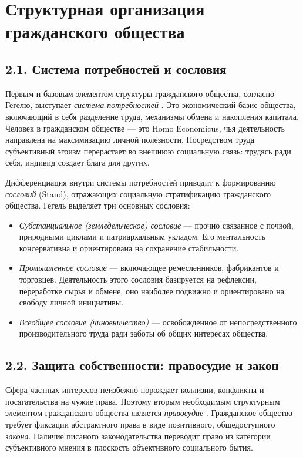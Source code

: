 \documentclass[a4paper, 14pt]{extarticle}
\begin{document}
\section{Структурная организация гражданского общества}

\subsection{2.1. Система потребностей и сословия}
Первым и базовым элементом структуры гражданского общества, согласно Гегелю, выступает \textit{система потребностей} \cite{Hegel}. Это экономический базис общества, включающий в себя разделение труда, механизмы обмена и накопления капитала. Человек в гражданском обществе --- это Homo Economicus, чья деятельность направлена на максимизацию личной полезности. Посредством труда субъективный эгоизм перерастает во внешнюю социальную связь: трудясь ради себя, индивид создает блага для других.

Дифференциация внутри системы потребностей приводит к формированию \textit{сословий} (Stand), отражающих социальную стратификацию гражданского общества. Гегель выделяет три основных сословия:
\begin{itemize}
    \item \textit{Субстанциальное (земледельческое) сословие} --- прочно связанное с почвой, природными циклами и патриархальным укладом. Его ментальность консервативна и ориентирована на сохранение стабильности.
    \item \textit{Промышленное сословие} --- включающее ремесленников, фабрикантов и торговцев. Деятельность этого сословия базируется на рефлексии, переработке сырья и обмене, оно наиболее подвижно и ориентировано на свободу личной инициативы.
    \item \textit{Всеобщее сословие (чиновничество)} --- освобожденное от непосредственного производительного труда ради заботы об общих интересах общества.
\end{itemize}

\subsection{2.2. Защита собственности: правосудие и закон}
Сфера частных интересов неизбежно порождает коллизии, конфликты и посягательства на чужие права. Поэтому вторым необходимым структурным элементом гражданского общества является \textit{правосудие} \cite{Hegel}. Гражданское общество требует фиксации абстрактного права в виде позитивного, общедоступного \textit{закона}. Наличие писаного законодательства переводит право из категории субъективного мнения в плоскость объективного социального бытия.
\end{document}

